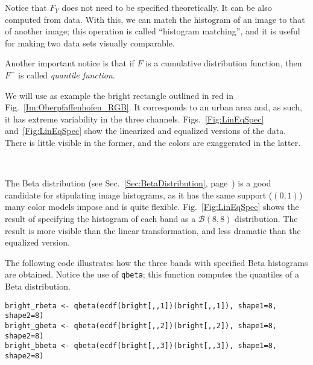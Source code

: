Notice that $F_Y$ does not need to be specified theoretically.
It can be also computed from data.
With this, we can match the histogram of an image to that of another image;
this operation is called ``histogram matching'', and it is useful for making two data sets visually comparable.

Another important notice is that if $F$ is a cumulative distribution function, then $F^-$ is called \textit{quantile function}.

We will use as example the bright rectangle outlined in red in Fig.~\ref{Im:Oberpfaffenhofen_RGB}.
It corresponds to an urban area and, as such, it has extreme variability in the three channels.
Figs.~\ref{Fig:LinEqSpec} and~\ref{Fig:LinEqSpec} show the linearized and equalized versions of the data.
There is little visible in the former, and the colors are exaggerated in the latter.

\begin{figure*}[hbt]
\centering
{}\ 
\ 
\caption{Examples of linearization, equalization and histogram specification of data from an urban area}\label{Fig:LinEqSpec}
\end{figure*}

The Beta distribution (see Sec.~\ref{Sec:BetaDistribution}, page~\pageref{Sec:BetaDistribution}) is a good candidate for stipulating image histograms, as it has the same support ($(0,1)$) many color models impose and is quite flexible.
Fig.~\ref{Fig:LinEqSpec} shows the result of specifying the histogram of each band as a $\mathcal B(8,8)$ distribution.
The result is more visible than the linear transformation, and less dramatic than the equalized version.

The following code illustrates how the three bands with specified Beta histograms are obtained.
Notice the use of \verb|qbeta|; this function computes the quantiles of a Beta distribution.
\begin{lstlisting}[frame=tb]
bright_rbeta <- qbeta(ecdf(bright[,,1])(bright[,,1]), shape1=8, shape2=8)
bright_gbeta <- qbeta(ecdf(bright[,,2])(bright[,,2]), shape1=8, shape2=8)
bright_bbeta <- qbeta(ecdf(bright[,,3])(bright[,,3]), shape1=8, shape2=8)
\end{lstlisting}

